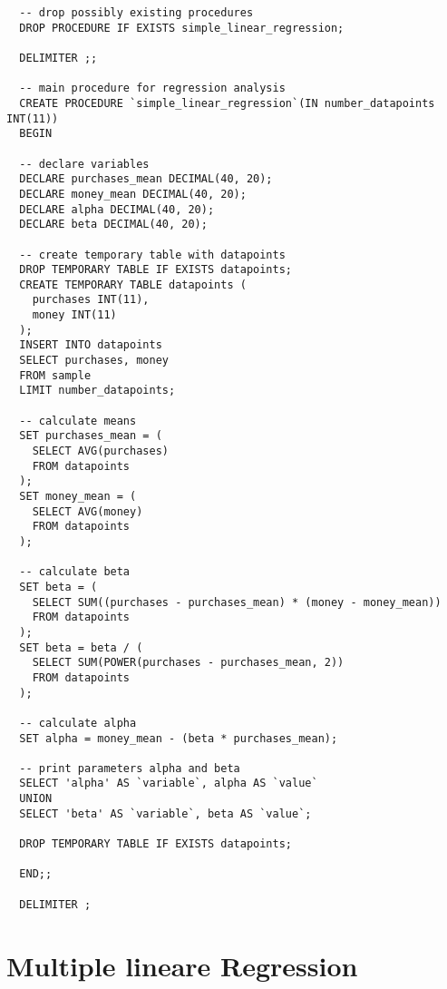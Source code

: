\begin{verbatim}
  -- drop possibly existing procedures
  DROP PROCEDURE IF EXISTS simple_linear_regression;

  DELIMITER ;;

  -- main procedure for regression analysis
  CREATE PROCEDURE `simple_linear_regression`(IN number_datapoints INT(11))
  BEGIN

  -- declare variables
  DECLARE purchases_mean DECIMAL(40, 20);
  DECLARE money_mean DECIMAL(40, 20);
  DECLARE alpha DECIMAL(40, 20);
  DECLARE beta DECIMAL(40, 20);

  -- create temporary table with datapoints
  DROP TEMPORARY TABLE IF EXISTS datapoints;
  CREATE TEMPORARY TABLE datapoints (
    purchases INT(11),
    money INT(11)
  );
  INSERT INTO datapoints
  SELECT purchases, money
  FROM sample
  LIMIT number_datapoints;

  -- calculate means
  SET purchases_mean = (
    SELECT AVG(purchases)
    FROM datapoints
  );
  SET money_mean = (
    SELECT AVG(money)
    FROM datapoints
  );

  -- calculate beta
  SET beta = (
    SELECT SUM((purchases - purchases_mean) * (money - money_mean))
    FROM datapoints
  );
  SET beta = beta / (
    SELECT SUM(POWER(purchases - purchases_mean, 2))
    FROM datapoints
  );

  -- calculate alpha
  SET alpha = money_mean - (beta * purchases_mean);

  -- print parameters alpha and beta
  SELECT 'alpha' AS `variable`, alpha AS `value`
  UNION
  SELECT 'beta' AS `variable`, beta AS `value`;

  DROP TEMPORARY TABLE IF EXISTS datapoints;

  END;;

  DELIMITER ;
\end{verbatim}

\section{Multiple lineare Regression}

